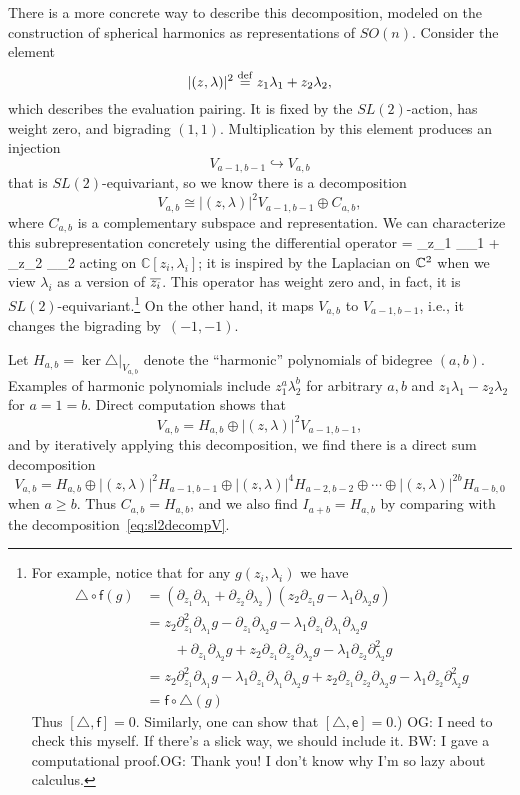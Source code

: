 \documentclass[11pt]{amsart}
\def\del{\partial}
\def\C{{\mathbb{C}}}
\newcommand{\sff}{\mathsf{f}}
\newcommand{\sfe}{\mathsf{e}}
\def\brian#1{{\textcolor{blue!65!red}{BW: {#1}}}}
\def\owen#1{{\textcolor{violet!65!black}{OG: {#1}}}}
\begin{document}
There is a more concrete way to describe this decomposition, 
modeled on the construction of spherical harmonics as representations of $SO(n)$.
Consider the element  
\[
|(z,\lambda)|^2 \define z_1 \lambda_1 + z_2 \lambda_2, 
\]
which describes the evaluation pairing. 
It is fixed by the $SL(2)$-action, has weight zero, and bigrading $(1,1)$.
Multiplication by this element produces an injection
\[
V_{a-1,b-1} \hookrightarrow V_{a,b}
\]
that is $SL(2)$-equivariant, so we know there is a decomposition 
\[
V_{a,b} \cong |(z,\lambda)|^2 V_{a-1,b-1} \oplus C_{a,b},
\]
where $C_{a,b}$ is a complementary subspace and representation.
We can characterize this subrepresentation concretely using the differential operator
\beqn
\triangle = \del_{z_1} \del_{\lambda_1} + \del_{z_2} \del_{\lambda_2}
\eeqn
acting on $\C[z_i,\lambda_i]$;
it is inspired by the Laplacian on $\CC^2$ when we view $\lambda_i$ as a version of $\Bar{z_i}$.
This operator has weight zero and, in fact, it is $SL(2)$-equivariant.\footnote{For example, notice that for any $g(z_i,\lambda_i)$ we have
\begin{align*}
\triangle \circ \sff(g) &= (\del_{z_1} \del_{\lambda_1} + \del_{z_2} \del_{\lambda_2})(z_2 \del_{z_1} g - \lambda_1 \del_{\lambda_2}g )\\
&= z_2 \del_{z_1}^2 \del_{\lambda_1} g - \del_{z_1} \del_{\lambda_2} g - \lambda_1 \del_{z_1} \del_{\lambda_1} \del_{\lambda_2} g \\ & \qquad + \del_{z_1} \del_{\lambda_2}  g + z_2 \del_{z_1} \del_{z_2} \del_{\lambda_2} g - \lambda_1 \del_{z_2} \del_{\lambda_2}^2 g \\ 
& = z_2 \del_{z_1}^2 \del_{\lambda_1} g - \lambda_1 \del_{z_1} \del_{\lambda_1} \del_{\lambda_2} g + z_2 \del_{z_1} \del_{z_2} \del_{\lambda_2} g - \lambda_1 \del_{z_2} \del_{\lambda_2}^2 g \\
&=  \sff \circ \triangle(g)
\end{align*}
Thus $[\triangle,\sff] = 0$.
Similarly, one can show that $[\triangle, \sfe] = 0$.)
\owen{I need to check this myself. If there's a slick way, we should include it.} \brian{I gave a computational proof.}\owen{Thank you! I don't know why I'm so lazy about calculus.}}
On the other hand, it maps $V_{a,b}$ to $V_{a-1,b-1}$, i.e., it changes the bigrading by~$(-1,-1)$.

Let $H_{a,b} = \ker \triangle|_{V_{a,b}}$ denote the ``harmonic'' polynomials of bidegree $(a,b)$.
Examples of harmonic polynomials include $z_1^a \lambda_2^b$ for arbitrary $a,b$ and
$z_1 \lambda_1 - z_2 \lambda_2$ for $a = 1 = b$.
Direct computation shows that 
\[
V_{a,b}  = H_{a,b} \oplus |(z,\lambda)|^2 V_{a-1,b-1},
\]
and by iteratively applying this decomposition, we find
there is a direct sum decomposition
\[
V_{a,b}  = H_{a,b} \oplus |(z,\lambda)|^2 H_{a-1,b-1} \oplus |(z,\lambda)|^4 H_{a-2,b-2} \oplus \cdots \oplus |(z,\lambda)|^{2b} H_{a-b,0} 
\]
when $a \geq b$.
Thus $C_{a,b} = H_{a,b}$, and we also find $I_{a+b} = H_{a,b}$ by comparing with the decomposition~\eqref{eq:sl2decompV}.
\end{document}
